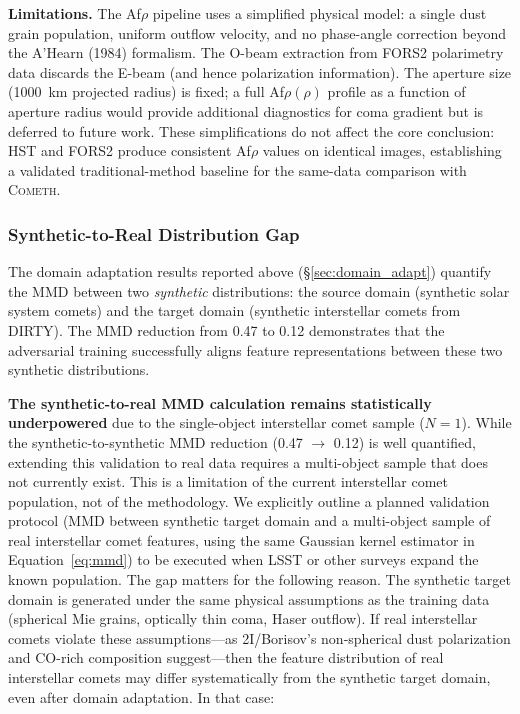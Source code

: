\documentclass[usenatbib]{mnras}
\begin{document}
\textbf{Limitations.} The Af$\rho$ pipeline uses a simplified physical model: a single dust grain population, uniform outflow velocity, and no phase-angle correction beyond the A'Hearn (1984) formalism. The O-beam extraction from FORS2 polarimetry data discards the E-beam (and hence polarization information). The aperture size (1000~km projected radius) is fixed; a full Af$\rho(\rho)$ profile as a function of aperture radius would provide additional diagnostics for coma gradient but is deferred to future work. These simplifications do not affect the core conclusion: HST and FORS2 produce consistent Af$\rho$ values on identical images, establishing a validated traditional-method baseline for the same-data comparison with \textsc{Cometh}.

\subsubsection{Synthetic-to-Real Distribution Gap}\label{sec:mmd_gap}

The domain adaptation results reported above (\S\ref{sec:domain_adapt}) quantify the MMD between two \textit{synthetic} distributions: the source domain (synthetic solar system comets) and the target domain (synthetic interstellar comets from DIRTY). The MMD reduction from 0.47 to 0.12 demonstrates that the adversarial training successfully aligns feature representations between these two synthetic distributions.

\textbf{The synthetic-to-real MMD calculation remains statistically underpowered} due to the single-object interstellar comet sample ($N=1$). While the synthetic-to-synthetic MMD reduction (0.47 $\to$ 0.12) is well quantified, extending this validation to real data requires a multi-object sample that does not currently exist. This is a limitation of the current interstellar comet population, not of the methodology. We explicitly outline a planned validation protocol (MMD between synthetic target domain and a multi-object sample of real interstellar comet features, using the same Gaussian kernel estimator in Equation~\ref{eq:mmd}) to be executed when LSST or other surveys expand the known population. The gap matters for the following reason. The synthetic target domain is generated under the same physical assumptions as the training data (spherical Mie grains, optically thin coma, Haser outflow). If real interstellar comets violate these assumptions---as 2I/Borisov's non-spherical dust polarization \citep{bagnulo21} and CO-rich composition \citep{bodewits20} suggest---then the feature distribution of real interstellar comets may differ systematically from the synthetic target domain, even after domain adaptation. In that case:
\end{document}
